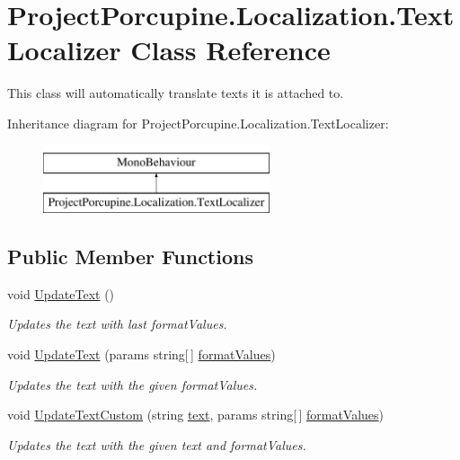 \hypertarget{class_project_porcupine_1_1_localization_1_1_text_localizer}{}\section{Project\+Porcupine.\+Localization.\+Text\+Localizer Class Reference}
\label{class_project_porcupine_1_1_localization_1_1_text_localizer}


This class will automatically translate texts it is attached to.  


Inheritance diagram for Project\+Porcupine.\+Localization.\+Text\+Localizer\+:\begin{figure}[H]
\begin{center}
\leavevmode
\includegraphics[height=2.000000cm]{class_project_porcupine_1_1_localization_1_1_text_localizer}
\end{center}
\end{figure}
\subsection*{Public Member Functions}
\begin{DoxyCompactItemize}
\item 
void \hyperlink{class_project_porcupine_1_1_localization_1_1_text_localizer_a2e8d0a2556047f360a020559b9e0e146}{Update\+Text} ()
\begin{DoxyCompactList}\small\item\em Updates the text with last format\+Values. \end{DoxyCompactList}\item 
void \hyperlink{class_project_porcupine_1_1_localization_1_1_text_localizer_a536420f231dc0c052270c3760ac6ed1e}{Update\+Text} (params string\mbox{[}$\,$\mbox{]} \hyperlink{class_project_porcupine_1_1_localization_1_1_text_localizer_aeddc75ef9f9461cd60bcf5f44e93dc82}{format\+Values})
\begin{DoxyCompactList}\small\item\em Updates the text with the given format\+Values. \end{DoxyCompactList}\item 
void \hyperlink{class_project_porcupine_1_1_localization_1_1_text_localizer_af61004030ca8202d0ffba67bdfd6fb32}{Update\+Text\+Custom} (string \hyperlink{class_project_porcupine_1_1_localization_1_1_text_localizer_a02a01eb50d14beb17efb078bee18374c}{text}, params string\mbox{[}$\,$\mbox{]} \hyperlink{class_project_porcupine_1_1_localization_1_1_text_localizer_aeddc75ef9f9461cd60bcf5f44e93dc82}{format\+Values})
\begin{DoxyCompactList}\small\item\em Updates the text with the given text and format\+Values. \end{DoxyCompactList}\end{DoxyCompactItemize}
